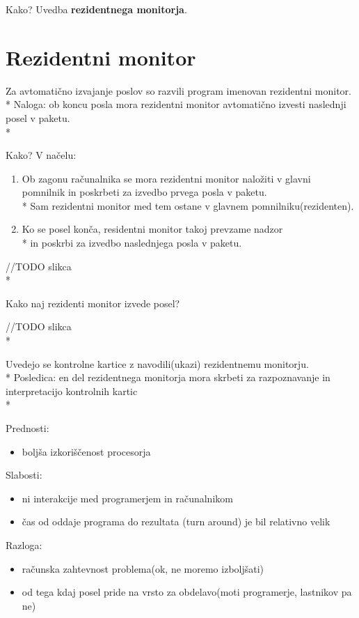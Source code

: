 \documentclass{article}
\begin{document}
Kako? Uvedba \textbf{rezidentnega monitorja}.

\section{Rezidentni monitor}

Za avtomatično izvajanje poslov so razvili program imenovan rezidentni monitor.\\*
Naloga: ob koncu posla mora rezidentni monitor avtomatično izvesti naslednji posel v paketu.\\*

Kako? V načelu:
\begin{enumerate}
  \item Ob zagonu računalnika se mora rezidentni monitor naložiti v glavni pomnilnik in poskrbeti za izvedbo prvega posla v paketu.\\* Sam rezidentni monitor med tem ostane v glavnem pomnilniku(rezidenten).

  \item Ko se posel konča, residentni monitor takoj prevzame nadzor\\*
in poskrbi za izvedbo naslednjega posla v paketu.
\end{enumerate}
//TODO slikca\\*

Kako naj rezidenti monitor izvede posel?

//TODO slikca\\*

Uvedejo se kontrolne kartice z navodili(ukazi) rezidentnemu monitorju.\\*
Posledica: en del rezidentnega monitorja mora skrbeti  za razpoznavanje in interpretacijo kontrolnih kartic\\*

Prednosti:
\begin{itemize}
  \item boljša izkoriščenost procesorja
\end{itemize}

Slabosti:
\begin{itemize}
  \item ni interakcije med programerjem in računalnikom
  \item čas od oddaje programa do rezultata (turn around) je bil relativno velik
\end{itemize}

Razloga:
\begin{itemize}
  \item računska zahtevnost problema(ok, ne moremo izboljšati)
  \item od tega kdaj posel pride na vrsto za obdelavo(moti programerje, lastnikov pa ne)
\end{itemize}
\end{document}
